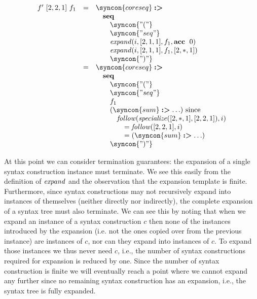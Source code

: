 \documentclass{kththesis}
\begin{document}
$$
\begin{array}{rcl}
f'~[2, 2, 1]~f_1 & = & \syncon{coreseq} \tagged \\
& & \quad \seq \\
& & \qquad \syncon{"("} \\
& & \qquad \syncon{"seq"} \\
& & \qquad \expand(i, [2, 1, 1], f_1, \acc~0) \\
& & \qquad \expand(i, [2, 1, 1], f_1, [2, *, 1]) \\
& & \qquad \syncon{")"} \\
& = & \syncon{coreseq} \tagged \\
& & \quad \seq \\
& & \qquad \syncon{"("} \\
& & \qquad \syncon{"seq"} \\
& & \qquad f_1 \\
& & \qquad (\syncon{sum} \tagged \ldots) \text{ since} \\
& & \qquad \quad \follow(\specialize([2, *, 1], [2, 2, 1]), i) \\
& & \qquad \qquad = \follow([2, 2, 1], i) \\
& & \qquad \qquad = (\syncon{sum} \tagged \ldots) \\
& & \qquad \syncon{")"} \\
\end{array}
$$

At this point we can consider termination guarantees: the expansion of a single syntax construction instance must terminate. We see this easily from the definition of $\mathit{expand}$ and the observation that the expansion template is finite. Furthermore, since syntax constructions may not recursively expand into instances of themselves (neither directly nor indirectly), the complete expansion of a syntax tree must also terminate. We can see this by noting that when we expand an instance of a syntax construction $c$ then none of the instances introduced by the expansion (i.e. not the ones copied over from the previous instance) are instances of $c$, nor can they expand into instances of $c$. To expand those instances we thus never need $c$, i.e., the number of syntax constructions required for expansion is reduced by one. Since the number of syntax construction is finite we will eventually reach a point where we cannot expand any further since no remaining syntax construction has an expansion, i.e., the syntax tree is fully expanded.
\end{document}
